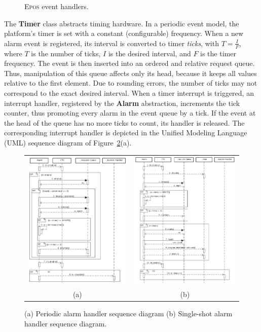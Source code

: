 \documentclass[final,3pd,times]{elsarticle}
\newcommand{\fig}[4][tbp]{
  \begin{figure}[#1]
    {\centering{\texttt{[image: \#2]}}\par}
    \caption{#3}
    \label{fig:#2}
  \end{figure}
}
\newcommand{\class}[1]{{\sffamily\bfseries{#1}}}
\begin{document}
\fig[bht]{epos_handler}{\textsc{Epos} event handlers.}{scale=.6}

The \class{Timer} class abstracts timing hardware.  In a periodic event
model, the platform's timer is set with a constant (configurable)
frequency. When a new alarm event is registered, its interval is
converted to timer \emph{ticks}, with $ T = \frac{I}{F} $, where $T$ is
the number of ticks, $I$ is the desired interval, and $F$ is the timer
frequency. The event is then inserted into an ordered and relative
request queue. Thus, manipulation of this queue affects only its head,
because it keeps all values relative to the first element.  Due to
rounding errors, the number of ticks may not correspond to the exact
desired interval. When a timer interrupt is triggered, an interrupt
handler, registered by the \class{Alarm} abstraction, increments the
tick counter, thus promoting every alarm in the event queue by a tick.
If the event at the head of the queue has no more ticks to count, its
handler is released. The corresponding interrupt handler is depicted in
the Unified Modeling Language (UML) sequence diagram of
Figure~\ref{fig:handlers}(a).


\begin{figure}[ht]
\centering
\begin{tabular}{cc}
\includegraphics[width=0.4\columnwidth]{handler_periodic} &
\includegraphics[width=0.41\columnwidth]{handler_single-shot}\\
(a)  & (b) \\
\end{tabular}
\caption{(a) Periodic alarm handler sequence diagram (b) Single-shot
  alarm handler sequence diagram.}
\label{fig:handlers}
\end{figure}
\end{document}
